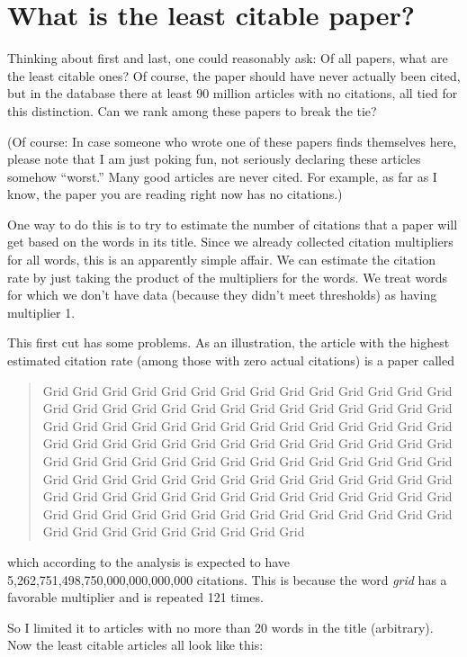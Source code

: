 \documentclass[twocolumn]{article}
\begin{document}
\section{What is the least citable paper?}

Thinking about first and last, one could reasonably ask: Of all
papers, what are the least citable ones? Of course, the paper should
have never actually been cited, but in the database there at least 90
million articles with no citations, all tied for this distinction. Can
we rank among these papers to break the tie?

(Of course: In case someone who wrote one of these papers finds
themselves here, please note that I am just poking fun, not seriously
declaring these articles somehow ``worst.'' Many good articles are
never cited. For example, as far as I know, the paper you are reading
right now has no citations.)

One way to do this is to try to estimate the number of citations that
a paper will get based on the words in its title. Since we already
collected citation multipliers for all words, this is an apparently
simple affair. We can estimate the citation rate by just taking the
product of the multipliers for the words. We treat words for which we
don't have data (because they didn't meet thresholds) as having
multiplier 1.

This first cut has some problems. As an illustration, the article
with the highest estimated citation rate (among those with zero actual
citations) is a paper\cite{leigland2009grid} called
\begin{quote}
Grid Grid Grid Grid Grid Grid Grid Grid Grid Grid Grid Grid Grid Grid Grid Grid Grid Grid Grid Grid Grid Grid Grid Grid Grid Grid Grid Grid Grid Grid Grid Grid Grid Grid Grid Grid Grid Grid Grid Grid Grid Grid Grid Grid Grid Grid Grid Grid Grid Grid Grid Grid Grid Grid Grid Grid Grid Grid Grid Grid Grid Grid Grid Grid Grid Grid Grid Grid Grid Grid Grid Grid Grid Grid Grid Grid Grid Grid Grid Grid Grid Grid Grid Grid Grid Grid Grid Grid Grid Grid Grid Grid Grid Grid Grid Grid Grid Grid Grid Grid Grid Grid Grid Grid Grid Grid Grid Grid Grid Grid Grid Grid Grid Grid Grid Grid Grid Grid Grid Grid Grid
\end{quote}
which according to the analysis is expected to have 5,262,751,498,750,000,000,000,000 citations.
This is because the word {\em grid} has a favorable multiplier and is
repeated 121 times. 

So I limited it to articles with no more than 20 words in the title
(arbitrary). Now the least citable articles all look like this:
\end{document}
